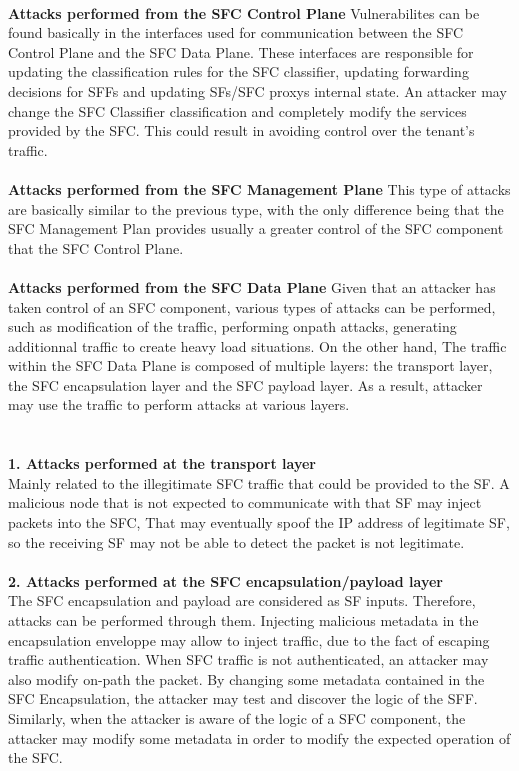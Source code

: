 \\
\textbf{Attacks performed from the SFC Control Plane}
Vulnerabilites can be found basically in the interfaces used for communication between the SFC Control Plane and the SFC Data Plane. These interfaces are responsible for updating the classification rules for the SFC classifier, updating forwarding decisions for SFFs and updating SFs/SFC proxys internal state. An attacker may change the SFC Classifier classification and
completely modify the services provided by the SFC. This could result in avoiding control over the tenant's traffic.\\
\\
\textbf{Attacks performed from the SFC Management Plane}
This type of attacks are basically similar to the previous type, with the only difference being that the SFC Management Plan provides usually a greater control of the SFC component that the SFC Control Plane.\\
\\
\textbf{Attacks performed from the SFC Data Plane} Given that an attacker has taken control of an SFC component, various types of attacks can be performed, such as modification of the traffic, performing onpath attacks, generating additionnal traffic to create heavy load situations. On the other hand, The traffic within the SFC Data Plane is composed of multiple
layers: the transport layer, the SFC encapsulation layer and the SFC payload layer. As a result, attacker may use the traffic to perform attacks at various layers.\\
\\
\\
\textbf{1. Attacks performed at the transport layer}\\
Mainly related to the illegitimate SFC traffic that could be provided to the SF. A malicious node that is not expected to communicate with that SF may inject packets into the SFC, That may eventually spoof the IP address of legitimate SF, so the receiving SF may not be able to detect the packet is not legitimate.\\
\\
\textbf{2. Attacks performed at the SFC encapsulation/payload layer}\\
The SFC encapsulation and payload are considered as SF inputs. Therefore, attacks can be performed through them. Injecting malicious metadata in the encapsulation enveloppe may allow to inject traffic, due to the fact of escaping traffic authentication. When SFC traffic is not authenticated, an attacker may also modify on-path the packet. By changing some metadata contained in the SFC Encapsulation, the attacker may test and discover the logic of the SFF. Similarly, when the attacker is aware of the logic of a SFC component, the attacker may modify some metadata in order to modify the expected operation of the SFC.
